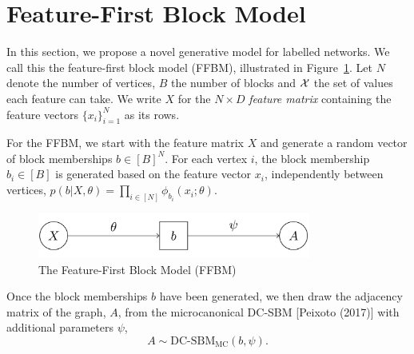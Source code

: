 \section{Feature-First Block Model}

In this section, we propose a novel generative model for labelled networks. We call this the feature-first block model (FFBM),
illustrated in Figure~\ref{fig:ffbm}.
%
Let $N$ denote the number of vertices, $B$ the number of blocks
and ${\cal X}$ the set of values each feature can take.
%
%
We write $X$ for the $N\times D$ {\em feature matrix} containing
the feature vectors $\{x_i\}_{i=1}^{N}$ 
as its rows.

For the FFBM, we start with the feature matrix $X$ and generate a random
vector of block memberships $b \in [B]^N$. For each vertex $i$, the
block membership $b_i\in[B]$ is generated based on the feature
vector $x_i$, independently between vertices, 
$p(b| X, \theta) = \prod_{i \in [N]} \phi_{b_i} (x_i; \theta)$.
%
%
%
%
\begin{figure}[!ht]
	\centering
%		
	\includegraphics[width=0.8\textwidth]{img/ffbm.png}
	\caption{The Feature-First Block Model (FFBM)}
	\label{fig:ffbm}
\end{figure}

Once the block memberships $b$ have been generated, we then draw the 
adjacency matrix of the graph, $A$, from the microcanonical DC-SBM [Peixoto (2017)] with additional parameters 
$\psi$,
%
\begin{equation}
	A \sim \textrm{DC-SBM}_{\textrm{MC}} (b, \psi).
	\label{eqn:A-generation}
\end{equation}
